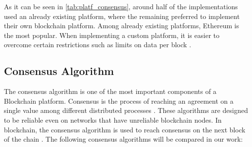 As it can be seen in \autoref{tab:platf_consensus}, around half of the implementations used an already existing platform, where the remaining preferred to implement their own blockchain platform. Among already existing platforms, Ethereum is the most popular. When implementing a custom platform, it is easier to overcome certain restrictions such as limits on data per block \cite{8733825, 9524833}.

\subsection{Consensus Algorithm}\label{background:consensus_algorithms}

The consensus algorithm is one of the most important components of a Blockchain platform. Consensus is the process of reaching an agreement on a single value among different distributed processes \cite{9347812}. These algorithms are designed to be reliable even on networks that have unreliable blockchain nodes. In blockchain, the consensus algorithm is used to reach consensus on the next block of the chain \cite{9079513}. The following consensus algorithms will be compared in our work:

